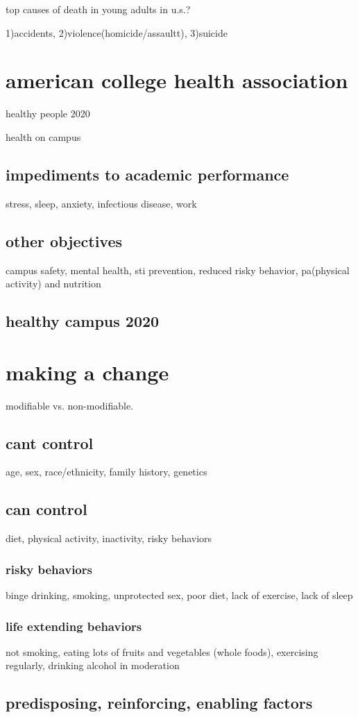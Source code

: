 \documentclass[letterpaper]{article}
\begin{document}
top causes of death in young adults in u.s.?

1)accidents, 2)violence(homicide/assaultt), 3)suicide

\section*{american college health association}
healthy people 2020

health on campus
\subsection*{impediments to academic performance}
stress, sleep, anxiety, infectious disease, work
\subsection*{other objectives}
campus safety, mental health, sti prevention, reduced risky behavior, pa(physical activity) and nutrition
\subsection*{healthy campus 2020}
\section*{making a change}
modifiable vs. non-modifiable.
\subsection*{cant control}
age, sex, race/ethnicity, family history, genetics
\subsection*{can control}
diet, physical activity, inactivity, risky behaviors
\subsubsection*{risky behaviors}
binge drinking, smoking, unprotected sex, poor diet, lack of exercise, lack of sleep
\subsubsection*{life extending behaviors}
not smoking, eating lots of fruits and vegetables (whole foods), exercising regularly, drinking alcohol in moderation
\subsection*{predisposing, reinforcing, enabling factors}
\end{document}
